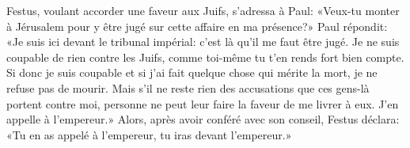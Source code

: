 Festus, voulant accorder une faveur aux Juifs, s’adressa à Paul:
	«Veux-tu monter à Jérusalem
	pour y être jugé sur cette affaire en ma présence?»
Paul répondit: «Je suis ici devant le tribunal impérial:
	c’est là qu’il me faut être jugé.
	Je ne suis coupable de rien contre les Juifs,
	comme toi-même tu t’en rends fort bien compte.
Si donc je suis coupable et si j’ai fait quelque chose qui mérite la mort,
	je ne refuse pas de mourir.
Mais s’il ne reste rien des accusations que ces gens-là portent contre moi,
	personne ne peut leur faire la faveur de me livrer à eux.
	J’en appelle à l’empereur.»
Alors, après avoir conféré avec son conseil, Festus déclara:
	«Tu en as appelé à l’empereur, tu iras devant l’empereur.»
